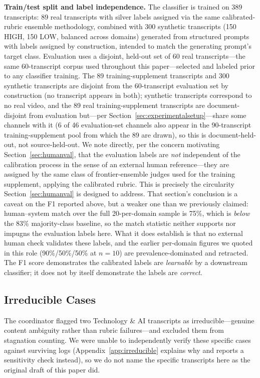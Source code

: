 \documentclass[11pt]{article}
\begin{document}
\textbf{Train/test split and label independence.} The classifier is trained
on 389 transcripts: 89 real transcripts with silver labels assigned via the
same calibrated-rubric ensemble methodology, combined with 300 synthetic
transcripts (150 HIGH, 150 LOW, balanced across domains) generated from
structured prompts with labels assigned by construction, intended to match
the generating prompt's target class. Evaluation uses a
disjoint, held-out set of 60 real transcripts---the same 60-transcript
corpus used throughout this paper---selected and labeled prior to any
classifier training. The 89 training-supplement transcripts and 300
synthetic transcripts are disjoint from the 60-transcript evaluation set by
construction (no transcript appears in both); synthetic transcripts
correspond to no real video, and the 89 real training-supplement
transcripts are document-disjoint from evaluation but---per
Section~\ref{sec:experimentalsetup}---share some channels with it (6 of 46
evaluation-set channels also appear in the 90-transcript training-supplement
pool from which the 89 are drawn), so this is document-held-out, not
source-held-out. We note directly, per the concern motivating
Section~\ref{sec:humanval}, that
the evaluation labels are \emph{not} independent of the calibration process
in the sense of an external human reference---they are assigned by the same
class of frontier-ensemble judges used for the training supplement, applying the
calibrated rubric. This is precisely the circularity Section~\ref{sec:humanval} is designed to
address. That section's conclusion is a caveat on the F1 reported above,
but a weaker one than we previously claimed: human--system match over the
full 20-per-domain sample is 75\%, which is \emph{below} the 83\%
majority-class baseline, so the match statistic neither supports nor
impugns the evaluation labels here. What it does establish is that no
external human check validates these labels, and the earlier per-domain
figures we quoted in this role (90\%/50\%/50\% at $n=10$) are
prevalence-dominated and retracted. The F1 score demonstrates the calibrated labels
are \emph{learnable} by a downstream classifier; it does not by itself
demonstrate the labels are \emph{correct}.

\subsection{Irreducible Cases}

The coordinator flagged two Technology \& AI transcripts as
irreducible---genuine content ambiguity rather than rubric failures---and
excluded them from stagnation counting. We were unable to independently
verify these specific cases against surviving logs (Appendix~\ref{app:irreducible}
explains why and reports a sensitivity check instead), so we do not name
the specific transcripts here as the original draft of this paper did.
\end{document}
